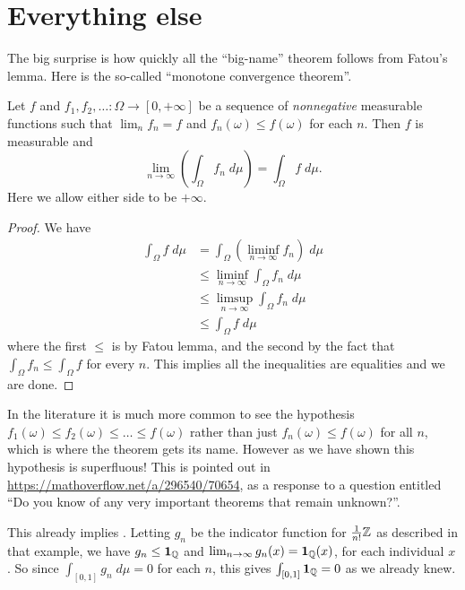 \section{Everything else}
The big surprise is how quickly all the ``big-name''
theorem follows from Fatou's lemma.
Here is the so-called ``monotone convergence theorem''.
\begin{corollary}
	Let $f$ and $f_1, f_2, \dots \colon \Omega \to [0,+\infty]$
	be a sequence of \emph{nonnegative}
	measurable functions such that $\lim_n f_n = f$
	and $f_n(\omega) \le f(\omega)$ for each $n$.
	Then $f$ is measurable and
	\[ \lim_{n \to \infty} \left( \int_\Omega f_n \; d\mu \right)
		= \int_\Omega f \; d\mu. \]
	Here we allow either side to be $+\infty$.
\end{corollary}
\begin{proof}
	We have
	\begin{align*}
		\int_\Omega f \; d\mu
		&= \int_\Omega \left( \liminf_{n \to \infty} f_n \right) \; d\mu \\
		&\le \liminf_{n \to \infty} \int_\Omega f_n \; d\mu \\
		&\le \limsup_{n \to \infty} \int_\Omega f_n \; d\mu \\
		&\le \int_\Omega f \; d\mu
	\end{align*}
	where the first $\le$ is by Fatou lemma,
	and the second by the fact that
	$\int_\Omega f_n \le \int_\Omega f$ for every $n$.
	This implies all the inequalities are equalities and we are done.
\end{proof}
\begin{remark}
	In the literature it is much more common
	to see the hypothesis $f_1(\omega) \le f_2(\omega) \le \dots \le f(\omega)$
	rather than just $f_n(\omega) \le f(\omega)$ for all $n$,
	which is where the theorem gets its name.
	However as we have shown this hypothesis is superfluous!
	This is pointed out in \url{https://mathoverflow.net/a/296540/70654},
	as a response to a question entitled
	``Do you know of any very important theorems that remain unknown?''.
\end{remark}

\begin{example}
	This already implies .
	Letting $g_n$ be the indicator function for $\frac1{n!}\mathbb Z$
	as described in that example, we have $g_n \le \mathbf{1}_\mathbb Q$
	and $\lim_{n \to \infty} g_n(x) = \mathbf{1}_\mathbb Q(x)$,
	for each individual $x$.
	So since $\int_{[0,1]} g_n \; d\mu = 0$ for each $n$,
	this gives $\int_{[0,1]} \mathbf{1}_\mathbb Q = 0$ as we already knew.
\end{example}

